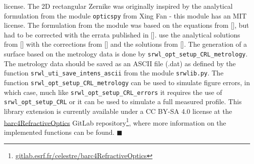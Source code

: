 \begin{refsection}
{license. The 2D rectangular Zernike was originally inspired by the analytical formulation from the module \texttt{opticspy} from Xing Fan - this module has an MIT license. The formulation from the module was based on the equations from [\cite{Mahajan2007}], but had to be corrected with the errata published in [\cite{Mahajan2012}].} use the analytical solutions from [\cite{Mahajan2007}] with the corrections from [\cite{Mahajan2012}] and the solutions from [\cite{Mahajan2010}].  The generation of a surface based on the metrology data is done by \texttt{srwl\_opt\_setup\_CRL\_metrology}. The metrology data should be saved as an ASCII file (.dat) as defined by the function \texttt{srwl\_uti\_save\_intens\_ascii} from the module \texttt{srwlib.py}. The function \texttt{srwl\_opt\_setup\_CRL\_metrology} can be used to simulate figure errors, in which case, much like \texttt{srwl\_opt\_setup\_CRL\_errors} it requires the use of \texttt{srwl\_opt\_setup\_CRL} or it can be used to simulate a full measured profile. This library extension is currently available under a CC BY-SA 4.0 license at the \href{https://gitlab.esrf.fr/celestre/barc4RefractiveOptics}{barc4RefractiveOptics} GitLab repository\footnote{\url{gitlab.esrf.fr/celestre/barc4RefractiveOptics}}, where more information on the implemented functions can be found. $\blacksquare$



\printbibliography[heading=subbibliography]
\end{refsection}

